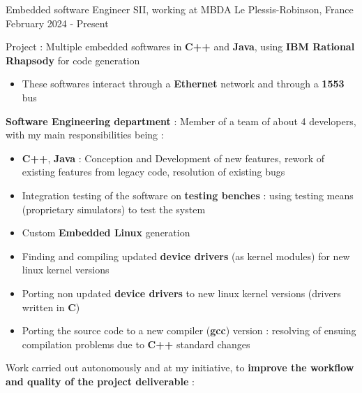 

\begin{cventries}

	\cventry
	{Embedded software Engineer} %
	{SII, working at MBDA} %
	{Le Plessis-Robinson, France} %
	{February 2024 - Present} %
	{
		\begin{cvitems} %
		\item{
			Project : Multiple embedded softwares in \textbf{C++} and \textbf{Java}, using \textbf{IBM Rational Rhapsody} for code generation
			\begin{itemize}
					\item{These softwares interact through a \textbf{Ethernet} network and through a \textbf{1553} bus}
			\end{itemize}
		}
		\item{
			\textbf{Software Engineering department} : Member of a team of about 4 developers, with my main responsibilities being :
			\begin{itemize}
				\item{\textbf{C++}, \textbf{Java} : Conception and Development of new features, rework of existing features from legacy code, resolution of existing bugs}
				\item{Integration testing of the software on \textbf{testing benches} : using testing means (proprietary simulators) to test the system}
				\item{Custom \textbf{Embedded Linux} generation}
				\item{Finding and compiling updated \textbf{device drivers} (as kernel modules) for new linux kernel versions}
				\item{Porting non updated \textbf{device drivers} to new linux kernel versions (drivers written in \textbf{C})}
				\item{Porting the source code to a new compiler (\textbf{gcc}) version : resolving of ensuing compilation problems due to \textbf{C++} standard changes}
			\end{itemize}
		}
		\item{
			Work carried out autonomously and at my initiative, to \textbf{improve the workflow and quality of the project deliverable} :
}
\end{cvitems}}
\end{cventries}
